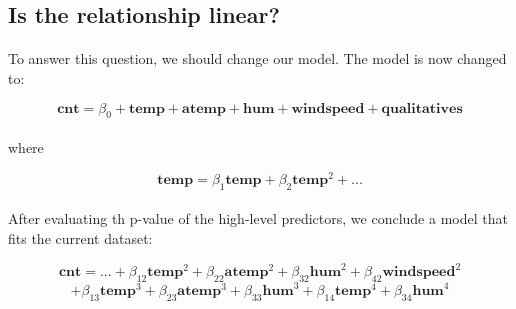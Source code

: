 \documentclass{article}[]
\begin{document}
\subsection{Is the relationship linear?}
\paragraph{}
To answer this question, we should change our model. The model is now changed to: 
\begin{center}
$$\textbf{cnt} = \beta_0+\textbf{temp}+\textbf{atemp}+\textbf{hum}+\textbf{windspeed}+\textbf{qualitatives}$$
\end{center}
\paragraph{}
where
\begin{center}
$$\textbf{temp} = \beta_1\textbf{temp}+\beta_2\textbf{temp}^2+...$$
\end{center}
\paragraph{}
After evaluating th p-value of the high-level predictors, we conclude a model that fits the current dataset:
\begin{center}
$$\textbf{cnt} = ...+\beta_{12}\textbf{temp}^2+\beta_{22}\textbf{atemp}^2+\beta_{32}\textbf{hum}^2+\beta_{42}\textbf{windspeed}^2$$
$$+\beta_{13}\textbf{temp}^3+\beta_{23}\textbf{atemp}^3+\beta_{33}\textbf{hum}^3+\beta_{14}\textbf{temp}^4+\beta_{34}\textbf{hum}^4$$
\end{center}
\end{document}
